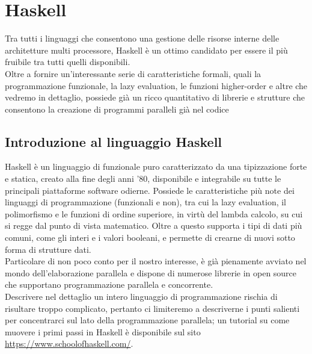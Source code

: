 


\chapter{Haskell}
Tra tutti i linguaggi che consentono una gestione delle risorse interne delle architetture multi processore, Haskell è un ottimo candidato per essere il più fruibile tra tutti quelli disponibili.\\
Oltre a fornire un'interessante serie di caratteristiche formali, quali la programmazione funzionale, la lazy evaluation, le funzioni higher-order e altre che vedremo in dettaglio, possiede già un ricco quantitativo di librerie e strutture che consentono la creazione di programmi paralleli già nel codice
\section{Introduzione al linguaggio Haskell}
Haskell è un linguaggio di funzionale puro caratterizzato da una tipizzazione forte e statica, creato alla fine degli anni '80, disponibile e integrabile su tutte le principali piattaforme software odierne. Possiede le caratteristiche più note dei linguaggi di programmazione (funzionali e non), tra cui la lazy evaluation, il polimorfismo e le funzioni di ordine superiore, in virtù del lambda calcolo, su cui si regge dal punto di vista matematico. Oltre a questo supporta i tipi di dati più comuni, come gli interi e i valori booleani, e permette di crearne di nuovi sotto forma di strutture dati.\\
Particolare di non poco conto per il nostro interesse, è già pienamente avviato nel mondo dell'elaborazione parallela e dispone di numerose librerie in open source che supportano programmazione parallela e concorrente.\\
Descrivere nel dettaglio un intero linguaggio di programmazione rischia di risultare troppo complicato, pertanto ci limiteremo a descriverne i punti salienti per concentrarci sul lato della programmazione parallela; un tutorial su come muovere i primi passi in Haskell è disponibile sul sito \url{https://www.schoolofhaskell.com/}.
